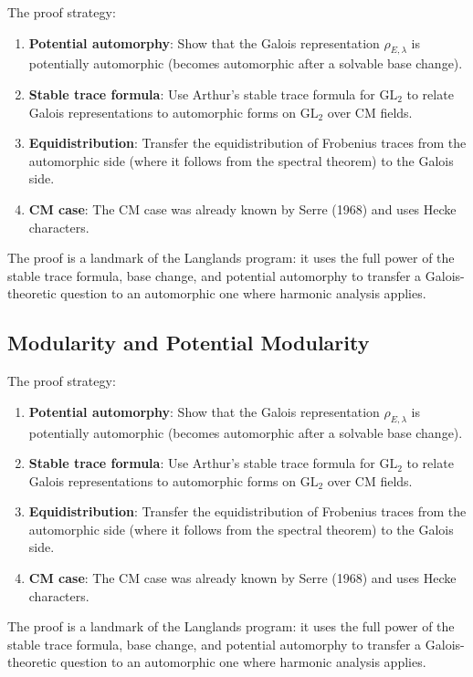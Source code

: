 The proof strategy:
\begin{enumerate}
\item \textbf{Potential automorphy}: Show that the Galois representation $\rho_{E,\lambda}$ is potentially automorphic (becomes automorphic after a solvable base change).
\item \textbf{Stable trace formula}: Use Arthur's stable trace formula for $\text{GL}_2$ to relate Galois representations to automorphic forms on $\text{GL}_2$ over CM fields.
\item \textbf{Equidistribution}: Transfer the equidistribution of Frobenius traces from the automorphic side (where it follows from the spectral theorem) to the Galois side.
\item \textbf{CM case}: The CM case was already known by Serre (1968) and uses Hecke characters.
\end{enumerate}

\begin{highlightbox}
The proof is a landmark of the Langlands program: it uses the full power of the stable trace formula, base change, and potential automorphy to transfer a Galois-theoretic question to an automorphic one where harmonic analysis applies.
\end{highlightbox}

\subsection{Modularity and Potential Modularity}

The proof strategy:
\begin{enumerate}
\item \textbf{Potential automorphy}: Show that the Galois representation $\rho_{E,\lambda}$ is potentially automorphic (becomes automorphic after a solvable base change).
\item \textbf{Stable trace formula}: Use Arthur's stable trace formula for $\text{GL}_2$ to relate Galois representations to automorphic forms on $\text{GL}_2$ over CM fields.
\item \textbf{Equidistribution}: Transfer the equidistribution of Frobenius traces from the automorphic side (where it follows from the spectral theorem) to the Galois side.
\item \textbf{CM case}: The CM case was already known by Serre (1968) and uses Hecke characters.
\end{enumerate}

\begin{highlightbox}
The proof is a landmark of the Langlands program: it uses the full power of the stable trace formula, base change, and potential automorphy to transfer a Galois-theoretic question to an automorphic one where harmonic analysis applies.
\end{highlightbox}

